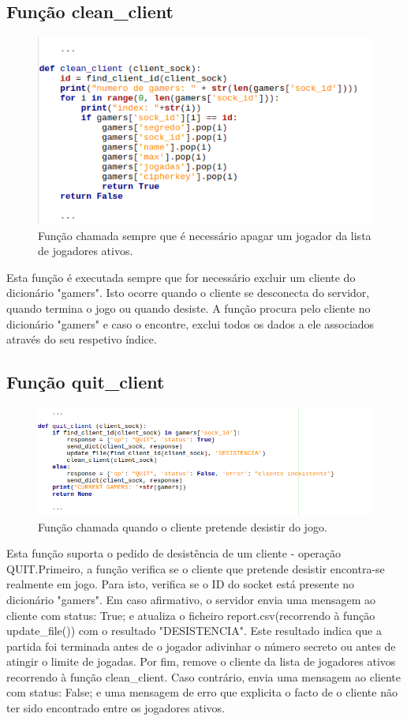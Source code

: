 \documentclass{report}
\begin{document}
\subsection{Função \textbf{clean\_client}}
\begin{figure}[H]
	\centering
	\includegraphics[scale=0.65]{clean_client}	
	\caption{Função chamada sempre que é necessário apagar um jogador da lista de jogadores ativos.}
\end{figure}

Esta função é executada sempre que for necessário excluir um cliente do dicionário "gamers". Isto ocorre quando o cliente se desconecta do servidor, quando termina o jogo ou quando desiste.
A função procura pelo cliente no dicionário "gamers" e caso o encontre, exclui todos os dados a ele associados através do seu respetivo índice.

\subsection{Função \textbf{quit\_client}}
\begin{figure}[H]
	\centering
	\includegraphics[scale=0.65]{quit_client}	
	\caption{Função chamada quando o cliente pretende desistir do jogo.}
\end{figure}

Esta função suporta o pedido de desistência de um cliente - operação QUIT.Primeiro, a função verifica se o cliente que pretende desistir encontra-se realmente em jogo. Para isto, verifica se o ID do socket está presente no dicionário "gamers".
Em caso afirmativo, o servidor envia uma mensagem ao cliente com status: True; e atualiza o ficheiro report.csv(recorrendo à função update\_file()) com o resultado "DESISTENCIA". Este resultado indica que a partida foi terminada antes de o jogador adivinhar o número secreto ou antes de atingir o limite de jogadas. Por fim, remove o cliente da lista de jogadores ativos recorrendo à função clean\_client.
Caso contrário, envia uma mensagem ao cliente com status: False; e uma mensagem de erro que explicita o facto de o cliente não ter sido encontrado entre os jogadores ativos.
\end{document}
